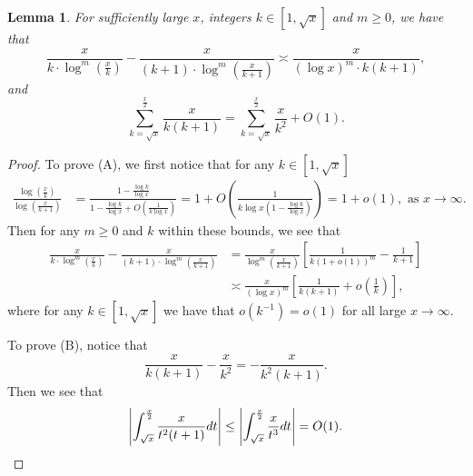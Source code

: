 \documentclass[11pt,reqno,a4letter]{article}
\numberwithin{figure}{section}
\numberwithin{table}{section}
\theoremstyle{plain}
\newtheorem{lemma}[theorem]{Lemma}
\numberwithin{theorem}{section}
\theoremstyle{definition}
\begin{document}
\begin{lemma}
\label{lemma_PrimePix_ErrorBoundDiffs_SimplifyingConditions_v1} 
For sufficiently large $x$, integers $k \in \left[1, \sqrt{x}\right]$ and 
$m \geq 0$, we have that 
\begin{equation} 
\tag{A} 
\frac{x}{k \cdot \log^m\left(\frac{x}{k}\right)} - 
     \frac{x}{(k+1) \cdot \log^m\left(\frac{x}{k+1}\right)}
     \asymp \frac{x}{(\log x)^m \cdot k(k+1)}, 
\end{equation} 
and 
\begin{equation} 
\tag{B} 
\sum_{k=\sqrt{x}}^{\frac{x}{2}} \frac{x}{k(k+1)} = 
     \sum_{k=\sqrt{x}}^{\frac{x}{2}} \frac{x}{k^2} + O(1). 
\end{equation} 
\end{lemma} 
\begin{proof} 
To prove (A), we first notice that for any $k \in \left[1, \sqrt{x}\right]$ 
\begin{align*}
\frac{\log\left(\frac{x}{k}\right)}{\log\left(\frac{x}{k+1}\right)} & = 
     \frac{1 - \frac{\log k}{\log x}}{1 - \frac{\log k}{\log x} + O\left(\frac{1}{k\log x}\right)} 
     = 1 + O\left(\frac{1}{k\log x\left(1 - \frac{\log k}{\log x}\right)}\right) 
     = 1 + o(1), \text{\ as\ } x \rightarrow \infty. 
\end{align*}
Then for any $m \geq 0$ and $k$ within these bounds, we see that 
\begin{align*}
\frac{x}{k \cdot \log^m\left(\frac{x}{k}\right)} - 
     \frac{x}{(k+1) \cdot \log^m\left(\frac{x}{k+1}\right)} & = \frac{x}{\log^m\left(\frac{x}{k+1}\right)} \left[ 
     \frac{1}{k(1+o(1))^m} - \frac{1}{k+1}\right] \\ 
     & \asymp \frac{x}{(\log x)^m} \left[\frac{1}{k(k+1)} + o\left(\frac{1}{k}\right)\right], 
\end{align*}
where for any $k \in \left[1, \sqrt{x}\right]$ we have that 
$o\left(k^{-1}\right) = o(1)$ for all large $x \rightarrow \infty$. 

To prove (B), notice that 
\[
\frac{x}{k(k+1)} - \frac{x}{k^2} = -\frac{x}{k^2(k+1)}. 
\]
Then we see that 
\[
\left\lvert \int_{\sqrt{x}}^{\frac{x}{2}} \frac{x}{t^2(t+1)} dt \right\rvert \leq 
     \left\lvert \int_{\sqrt{x}}^{\frac{x}{2}} \frac{x}{t^3} dt \right\rvert = O(1). 
     \qedhere 
\]
\end{proof} 
\end{document}
